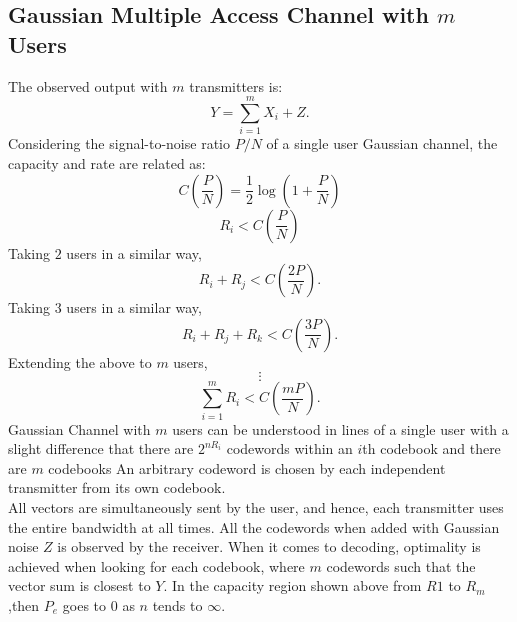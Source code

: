 \subsection{Gaussian Multiple Access Channel with \( m \) Users} \label{sec 6.2}
The observed output with \( m \) transmitters is:
\begin{equation}
Y = \sum_{i=1}^m X_i + Z.
\end{equation}
Considering the signal-to-noise ratio \( P/N \) of a single user Gaussian channel, the capacity and rate are related as:
\begin{equation}
C \left( \frac{P}{N} \right) = \frac{1}{2} \log \left( 1 + \frac{P}{N} \right)
\end{equation}
\begin{equation}
R_i < C \left( \frac{P}{N} \right)
\end{equation}
Taking $2$ users in a similar way, 
\begin{equation}
R_i + R_j < C \left( \frac{2P}{N} \right).
\end{equation}
Taking $3$ users in a similar way, 
\begin{equation}
R_i + R_j + R_k < C \left( \frac{3P}{N} \right).
\end{equation}
Extending the above to $m$ users,
\begin{equation}
\vdots
\end{equation}
\begin{equation}
\sum_{i=1}^m R_i < C \left( \frac{mP}{N} \right).
\end{equation}
Gaussian Channel with \( m \) users can be understood in lines of a single user with a slight difference that there are \( 2^{n R_i} \) codewords within an \( i \)th codebook and there are  \( m \) codebooks 
An arbitrary codeword is chosen by each independent transmitter from its own codebook. 
\\All vectors are simultaneously sent by the user, and hence, each transmitter uses the entire bandwidth at all times. All the codewords when added with Gaussian noise \( Z \) is observed by the receiver.
When it comes to decoding, optimality is achieved when looking for each codebook, where \( m \) codewords such that the vector sum is closest to \( Y \).
In the capacity region shown above from \( R1 \) to \( R_m \) ,then \( P_e\) goes to $0$ as \( n \) tends to $\infty$.

